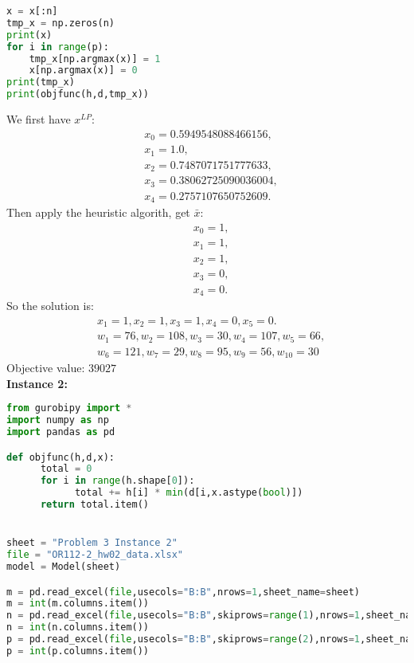 \documentclass[12pt]{article}
\begin{document}
\begin{enumerate}
\begin{enumerate}
\begin{lstlisting}[language=Python]
x = x[:n]
tmp_x = np.zeros(n)
print(x)
for i in range(p):
    tmp_x[np.argmax(x)] = 1
    x[np.argmax(x)] = 0
print(tmp_x)
print(objfunc(h,d,tmp_x))
                        \end{lstlisting}
                  We first have $x^{LP}$:
                  \begin{align*}
                        &x_{0} = 0.5949548088466156,\\ 
                        &x_{1} = 1.0,\\
                        &x_{2} = 0.7487071751777633, \\
                        &x_{3} = 0.38062725090036004,\\
                        &x_{4} = 0.2757107650752609.
                  \end{align*}
                  Then apply the heuristic algorith, get
                  $\bar{x}$:
                  \begin{align*}
                        &x_{0} = 1,\\ 
                        &x_{1} = 1,\\
                        &x_{2} = 1, \\
                        &x_{3} = 0,\\
                        &x_{4} = 0.
                  \end{align*}
                  So the solution is:
                  \begin{align*}
                        &x_1 = 1, x_2 = 1, x_3 = 1, x_4 = 0, x_5 = 0.\\
                              &w_1 = 76, w_2 = 108, w_3 = 30, w_4 = 107, w_5 = 66,\\ 
                              &w_6 = 121, w_7 = 29, w_8 = 95, w_9 = 56, w_{10} = 30
                  \end{align*}
                  Objective value:  $39027$\\
                  \textbf{Instance 2:}
                  \begin{lstlisting}[language=Python]
from gurobipy import *
import numpy as np
import pandas as pd

def objfunc(h,d,x):
      total = 0
      for i in range(h.shape[0]):
            total += h[i] * min(d[i,x.astype(bool)])
      return total.item()


sheet = "Problem 3 Instance 2"
file = "OR112-2_hw02_data.xlsx"
model = Model(sheet)

m = pd.read_excel(file,usecols="B:B",nrows=1,sheet_name=sheet)
m = int(m.columns.item())
n = pd.read_excel(file,usecols="B:B",skiprows=range(1),nrows=1,sheet_name=sheet)
n = int(n.columns.item())
p = pd.read_excel(file,usecols="B:B",skiprows=range(2),nrows=1,sheet_name=sheet)
p = int(p.columns.item())


\end{lstlisting}
\end{enumerate}
\end{enumerate}
\end{document}
